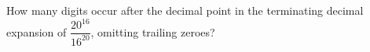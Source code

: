 How many digits occur after the decimal point in the terminating decimal expansion of $\dfrac{20^{16}}{16^{20}}$, omitting trailing zeroes?
